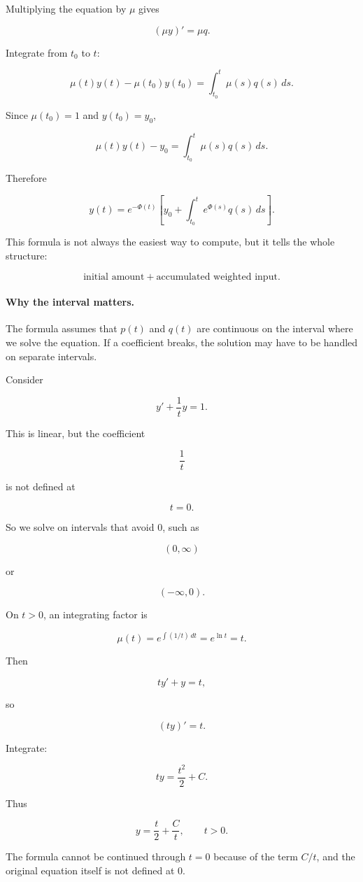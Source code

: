 Multiplying the equation by \(\mu\) gives

\[
(\mu y)'=\mu q.
\]

Integrate from \(t_0\) to \(t\):

\[
\mu(t)y(t)-\mu(t_0)y(t_0)
=
\int_{t_0}^{t}\mu(s)q(s)\,ds.
\]

Since \(\mu(t_0)=1\) and \(y(t_0)=y_0\),

\[
\mu(t)y(t)-y_0
=
\int_{t_0}^{t}\mu(s)q(s)\,ds.
\]

Therefore

\[
\boxed{
y(t)
=
e^{-\Phi(t)}
\left[
y_0+\int_{t_0}^{t}e^{\Phi(s)}q(s)\,ds
\right].
}
\]

This formula is not always the easiest way to compute, but it tells the whole structure:

\[
\text{initial amount}
+
\text{accumulated weighted input}.
\]

\paragraph{Why the interval matters.}
The formula assumes that \(p(t)\) and \(q(t)\) are continuous on the interval where we
solve the equation.  If a coefficient breaks, the solution may have to be handled on
separate intervals.

Consider

\[
y'+\frac1t y=1.
\]

This is linear, but the coefficient

\[
\frac1t
\]

is not defined at

\[
t=0.
\]

So we solve on intervals that avoid \(0\), such as

\[
(0,\infty)
\]

or

\[
(-\infty,0).
\]

On \(t>0\), an integrating factor is

\[
\mu(t)=e^{\int (1/t)\,dt}=e^{\ln t}=t.
\]

Then

\[
ty'+y=t,
\]

so

\[
(ty)'=t.
\]

Integrate:

\[
ty=\frac{t^2}{2}+C.
\]

Thus

\[
\boxed{
y=\frac t2+\frac{C}{t},
\qquad t>0.
}
\]

The formula cannot be continued through \(t=0\) because of the term \(C/t\), and the
original equation itself is not defined at \(0\).

